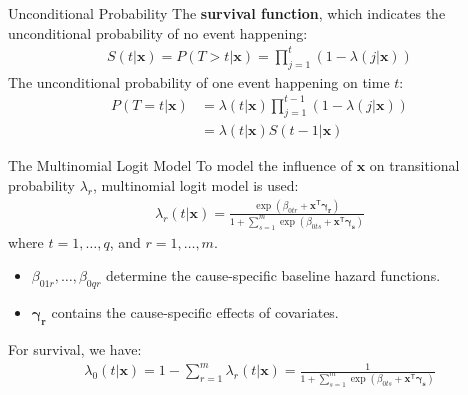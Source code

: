 \documentclass{beamer}
\begin{document}
    \begin{frame}{Unconditional Probability}
        The {\bf survival function}, which indicates the unconditional probability of no event happening:
        \begin{align*}
        S(t|\mathbf{x}) = P(T > t | \mathbf{x}) = \prod_{j = 1}^{t} (1-\lambda(j|\mathbf{x}))
        \end{align*}
        The unconditional probability of one event happening on time $t$:
        \begin{align*}
            P(T= t|\mathbf{x}) &= \lambda(t|\mathbf{x}) \prod_{j = 1}^{t-1} (1-\lambda(j|\mathbf{x})) \\
            &= \lambda(t|\mathbf{x}) S(t-1|\mathbf{x})
        \end{align*}
    \end{frame}
    
    \begin{frame}{The Multinomial Logit Model}
        To model the influence of $\mathbf{x}$ on transitional probability $\lambda_r$, multinomial logit model is used:
        \begin{align*}
        \lambda_r(t|\mathbf{x}) = \frac{ \exp{ (\beta_{0tr}+\mathbf{x}^\mathsf{T} \mathbf{\gamma_r} ) } }{ 1+ \sum_{s=1}^{m} \exp{ (\beta_{0ts}+\mathbf{x}^\mathsf{T} \mathbf{\gamma_s}) }  }
        \end{align*}
        where $t = 1,\dots, q$, and $r = 1,\dots, m$.
        \begin{itemize}
            \item $\beta_{01r}, \dots, \beta_{0qr}$ determine the
            cause-specific baseline hazard functions.
            \item $\mathbf{\gamma_r}$ contains the cause-specific effects of covariates.
        \end{itemize}
        For survival, we have:
        \begin{align*}
        \lambda_0(t|\mathbf{x})= 1 - \sum_{r=1}^{m} \lambda_r(t|\mathbf{x}) = \frac{ 1 }{ 1+ \sum_{s=1}^{m} \exp{ (\beta_{0ts}+\mathbf{x}^\mathsf{T} \mathbf{\gamma_s}) }  }
        \end{align*}
        
    \end{frame}
    
\end{document}
